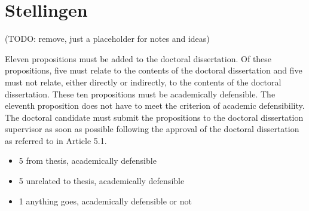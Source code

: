 \chapter*{Stellingen}

(TODO: remove, just a placeholder for notes and ideas)


Eleven propositions must be added to the doctoral dissertation. Of these propositions,
five must relate to the contents of the doctoral dissertation and five must not relate,
either directly or indirectly, to the contents of the doctoral dissertation. These ten
propositions must be academically defensible. The eleventh proposition does not have
to meet the criterion of academic defensibility. The doctoral candidate must submit the
propositions to the doctoral dissertation supervisor as soon as possible following the
approval of the doctoral dissertation as referred to in Article 5.1.

\begin{itemize}
\item 5 from thesis, academically defensible
\item 5 unrelated to thesis, academically defensible
\item 1 anything goes, academically defensible or not
\end{itemize}

\begin{comment}
ideas

\begin{itemize}
\item This manuscript
    \begin{itemize}
    \item Training is pivotal

    \end{itemize}
\item Academia
    \begin{itemize}
     \item Scientists should write up results for general public as well as scientific journals
     \item Open science FTW, no more paywalled journals. or use money to pay peer reviewers to do thorough testing. or professional reviewers.
     \item Do we even need journals? system of completely open peer review could replace
     \item post-publication public peer review FTW
    \end{itemize}
\end{itemize}
\end{comment}
